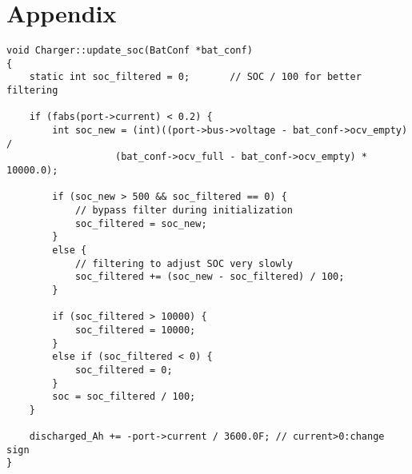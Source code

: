 

\chapter{Appendix}



\label{code:libreSolarSoC}
\begin{lstlisting}
void Charger::update_soc(BatConf *bat_conf)
{
    static int soc_filtered = 0;       // SOC / 100 for better filtering

    if (fabs(port->current) < 0.2) {
        int soc_new = (int)((port->bus->voltage - bat_conf->ocv_empty) /
                   (bat_conf->ocv_full - bat_conf->ocv_empty) * 10000.0);

        if (soc_new > 500 && soc_filtered == 0) {
            // bypass filter during initialization
            soc_filtered = soc_new;
        }
        else {
            // filtering to adjust SOC very slowly
            soc_filtered += (soc_new - soc_filtered) / 100;
        }

        if (soc_filtered > 10000) {
            soc_filtered = 10000;
        }
        else if (soc_filtered < 0) {
            soc_filtered = 0;
        }
        soc = soc_filtered / 100;
    }

    discharged_Ah += -port->current / 3600.0F; // current>0:change sign
}
\end{lstlisting}


